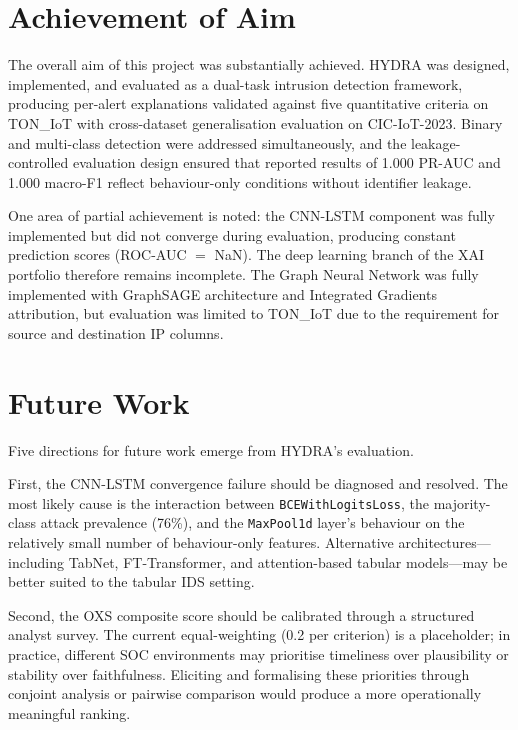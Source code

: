 \documentclass[12pt,a4paper]{report}
\begin{document}
\section{Achievement of Aim}
\label{sec:achievement}

The overall aim of this project was substantially achieved. HYDRA was designed, implemented, and evaluated as a dual-task intrusion detection framework, producing per-alert explanations validated against five quantitative criteria on TON\_IoT with cross-dataset generalisation evaluation on CIC-IoT-2023. Binary and multi-class detection were addressed simultaneously, and the leakage-controlled evaluation design ensured that reported results of 1.000 PR-AUC and 1.000 macro-F1 reflect behaviour-only conditions without identifier leakage.

One area of partial achievement is noted: the CNN-LSTM component was fully implemented but did not converge during evaluation, producing constant prediction scores (ROC-AUC $=$ NaN). The deep learning branch of the XAI portfolio therefore remains incomplete. The Graph Neural Network was fully implemented with GraphSAGE architecture and Integrated Gradients attribution, but evaluation was limited to TON\_IoT due to the requirement for source and destination IP columns.

\section{Future Work}
\label{sec:future}

Five directions for future work emerge from HYDRA's evaluation.

First, the CNN-LSTM convergence failure should be diagnosed and resolved. The most likely cause is the interaction between \texttt{BCEWithLogitsLoss}, the majority-class attack prevalence (76\%), and the \texttt{MaxPool1d} layer's behaviour on the relatively small number of behaviour-only features. Alternative architectures---including TabNet, FT-Transformer, and attention-based tabular models---may be better suited to the tabular IDS setting.

Second, the OXS composite score should be calibrated through a structured analyst survey. The current equal-weighting (0.2 per criterion) is a placeholder; in practice, different SOC environments may prioritise timeliness over plausibility or stability over faithfulness. Eliciting and formalising these priorities through conjoint analysis or pairwise comparison would produce a more operationally meaningful ranking.
\end{document}
